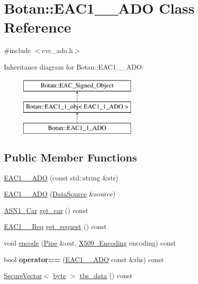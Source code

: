 \hypertarget{classBotan_1_1EAC1__1__ADO}{\section{Botan\-:\-:E\-A\-C1\-\_\-\_\-\-A\-D\-O Class Reference}
\label{classBotan_1_1EAC1__1__ADO}
}


{\ttfamily \#include $<$cvc\-\_\-ado.\-h$>$}

Inheritance diagram for Botan\-:\-:E\-A\-C1\-\_\-\_\-\-A\-D\-O\-:\begin{figure}[H]
\begin{center}
\leavevmode
\includegraphics[height=3.000000cm]{classBotan_1_1EAC1__1__ADO}
\end{center}
\end{figure}
\subsection*{Public Member Functions}
\begin{DoxyCompactItemize}
\item 
\hyperlink{classBotan_1_1EAC1__1__ADO_a04e266c6485041f3f0db368489ab27bd}{E\-A\-C1\-\_\-\_\-\-A\-D\-O} (const std\-::string \&str)
\item 
\hyperlink{classBotan_1_1EAC1__1__ADO_a1223923154efa2b1084ba3bde6a99aef}{E\-A\-C1\-\_\-\_\-\-A\-D\-O} (\hyperlink{classBotan_1_1DataSource}{Data\-Source} \&source)
\item 
\hyperlink{classBotan_1_1ASN1__Car}{A\-S\-N1\-\_\-\-Car} \hyperlink{classBotan_1_1EAC1__1__ADO_ac7d12bb84899d904bb33bff7615930bb}{get\-\_\-car} () const 
\item 
\hyperlink{classBotan_1_1EAC1__1__Req}{E\-A\-C1\-\_\-\_\-\-Req} \hyperlink{classBotan_1_1EAC1__1__ADO_ad9d9d92e5740d81016720b28cc0b4668}{get\-\_\-request} () const 
\item 
void \hyperlink{classBotan_1_1EAC1__1__ADO_a0f22dc8fcbe3c1f4f5e89e090224d2fc}{encode} (\hyperlink{classBotan_1_1Pipe}{Pipe} \&out, \hyperlink{namespaceBotan_a53759b4ed1fb93549f307fcf68729d2f}{X509\-\_\-\-Encoding} encoding) const 
\item 
\hypertarget{classBotan_1_1EAC1__1__ADO_aa03eb784616655405944e7a20ec67a2f}{bool {\bfseries operator==} (\hyperlink{classBotan_1_1EAC1__1__ADO}{E\-A\-C1\-\_\-\_\-\-A\-D\-O} const \&rhs) const }\label{classBotan_1_1EAC1__1__ADO_aa03eb784616655405944e7a20ec67a2f}

\item 
\hyperlink{classBotan_1_1SecureVector}{Secure\-Vector}$<$ \hyperlink{namespaceBotan_a7d793989d801281df48c6b19616b8b84}{byte} $>$ \hyperlink{classBotan_1_1EAC1__1__ADO_a04ba7c24bf6e7385fc73fe0d48496a2f}{tbs\-\_\-data} () const 
\end{DoxyCompactItemize}
